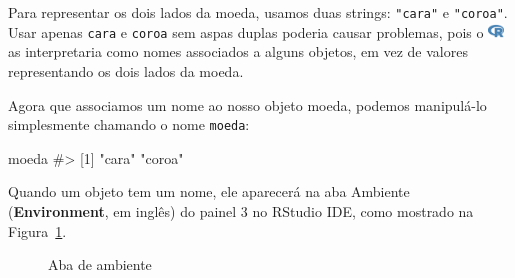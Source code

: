 \documentclass[
  letterpaper,
]{book}
\newenvironment{Shaded}{\begin{snugshade}}{\end{snugshade}}
\newcommand{\CommentTok}[1]{\textcolor[rgb]{0.37,0.37,0.37}{#1}}
\newcommand{\NormalTok}[1]{\textcolor[rgb]{0.00,0.23,0.31}{#1}}
\theoremstyle{definition}
\theoremstyle{plain}
\theoremstyle{remark}
\begin{document}
\begin{tcolorbox}[enhanced jigsaw, coltitle=black, titlerule=0mm, opacitybacktitle=0.6, title=\textcolor{quarto-callout-note-color}{\faInfo}\hspace{0.5em}{Nota}, bottomrule=.15mm, colbacktitle=quarto-callout-note-color!10!white, colback=white, toptitle=1mm, arc=.35mm, left=2mm, breakable, rightrule=.15mm, opacityback=0, colframe=quarto-callout-note-color-frame, leftrule=.75mm, bottomtitle=1mm, toprule=.15mm]

Para representar os dois lados da moeda, usamos duas strings:
\texttt{"cara"} e \texttt{"coroa"}. Usar apenas \texttt{cara} e
\texttt{coroa} sem aspas duplas poderia causar problemas, pois o
\includegraphics[width=1.13em,height=1em]{getting_started_with_r_files/figure-pdf/fa-icon-9b00320707d42527dde67262afb33ded.pdf}
as interpretaria como nomes associados a alguns objetos, em vez de
valores representando os dois lados da moeda.

\end{tcolorbox}

Agora que associamos um nome ao nosso objeto moeda, podemos manipulá-lo
simplesmente chamando o nome \texttt{moeda}:

\begin{Shaded}
\begin{Highlighting}[]
\NormalTok{moeda}
\CommentTok{\#\textgreater{} [1] "cara"  "coroa"}
\end{Highlighting}
\end{Shaded}

Quando um objeto tem um nome, ele aparecerá na aba Ambiente
(\textbf{Environment}, em inglês) do painel 3 no RStudio IDE, como
mostrado na Figura~\ref{fig-panel3-environment-tab}.

\begin{figure}


\caption{\label{fig-panel3-environment-tab}Aba de ambiente}

\end{figure}%
\end{document}
